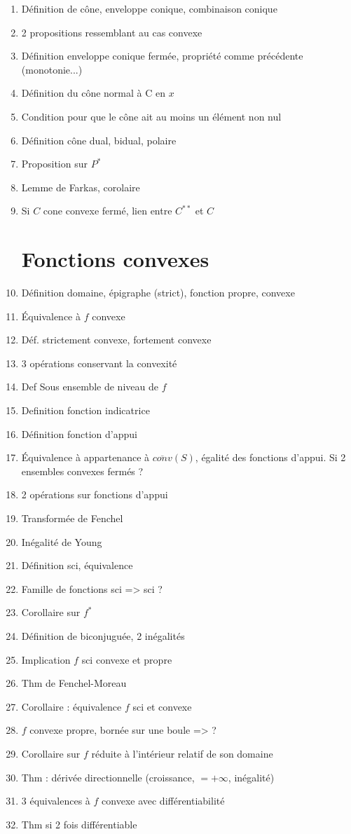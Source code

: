 \documentclass{article}
\begin{document}
\begin{enumerate}
	\item Définition de cône, enveloppe conique, combinaison conique
	\item 2 propositions ressemblant au cas convexe
	\item Définition enveloppe conique fermée, propriété comme précédente (monotonie...)
	\item Définition du cône normal à C en $x$
	\item Condition pour que le cône ait au moins un élément non nul
	\item Définition cône dual, bidual, polaire
	\item Proposition sur $P^*$
	\item Lemme de Farkas, corolaire
	\item Si $C$ cone convexe fermé, lien entre $C^{**}$ et $C$
\section{Fonctions convexes}
	\item Définition domaine, épigraphe (strict), fonction propre, convexe
	\item Équivalence à $f$ convexe
	\item Déf. strictement convexe, fortement convexe
	\item 3 opérations conservant la convexité
	\item Def Sous ensemble de niveau de $f$
	\item Definition fonction indicatrice
	\item Définition fonction d'appui
	\item Équivalence à appartenance à $\overline{conv}(S)$, égalité des fonctions d'appui. Si 2 ensembles convexes fermés ?
	\item 2 opérations sur fonctions d'appui
	\item Transformée de Fenchel
	\item Inégalité de Young
	\item Définition sci, équivalence
	\item Famille de fonctions sci => sci ?
	\item Corollaire sur $f^*$
	\item Définition de biconjuguée, 2 inégalités
	\item Implication $f$ sci convexe et propre
	\item Thm de Fenchel-Moreau
	\item Corollaire : équivalence $f$ sci et convexe
	\item $f$ convexe propre, bornée sur une boule => ?
	\item Corollaire sur $f$ réduite à l'intérieur relatif de son domaine
	\item Thm : dérivée directionnelle (croissance, $=+\infty$, inégalité)
	\item 3 équivalences à $f$ convexe avec différentiabilité
	\item Thm si 2 fois différentiable
\end{enumerate}
\end{document}
